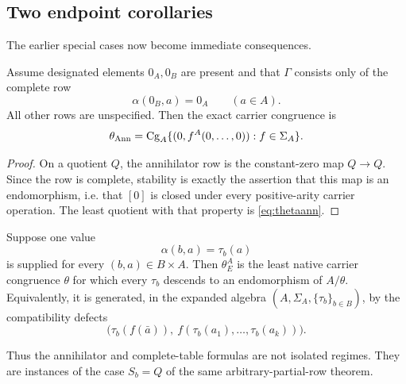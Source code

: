 \subsection{Two endpoint corollaries}

The earlier special cases now become immediate consequences.

\begin{corollary}\label{cor:ann}
Assume designated elements $0_A,0_B$ are present and that $\Gamma$ consists only of the complete row
\[
\alpha(0_B,a)=0_A
\qquad(a\in A).
\]
All other rows are unspecified. Then the exact carrier congruence is
\begin{equation}\label{eq:thetaann}
\theta_{\rm Ann}
=
\operatorname{Cg}_A\{(0,f^A(0,\ldots,0)):f\in\Sigma_A\}.
\end{equation}
\end{corollary}

\begin{proof}
On a quotient $Q$, the annihilator row is the constant-zero map $Q\to Q$.  Since the row is complete, stability is exactly the assertion that this map is an endomorphism, i.e. that $[0]$ is closed under every positive-arity carrier operation.  The least quotient with that property is \eqref{eq:thetaann}.
\end{proof}

\begin{corollary}\label{cor:complete}
Suppose one value
\[
\alpha(b,a)=\tau_b(a)
\]
is supplied for every $(b,a)\in B\times A$.  Then $\theta_E^A$ is the least native carrier congruence $\theta$ for which every $\tau_b$ descends to an endomorphism of $A/\theta$.  Equivalently, it is generated, in the expanded algebra $(A,\Sigma_A,\{\tau_b\}_{b\in B})$, by the compatibility defects
\[
\bigl(\tau_b(f(\bar a)),\ f(\tau_b(a_1),\ldots,\tau_b(a_k))\bigr).
\]
\end{corollary}

Thus the annihilator and complete-table formulas are not isolated regimes.  They are instances of the case $S_b=Q$ of the same arbitrary-partial-row theorem.

